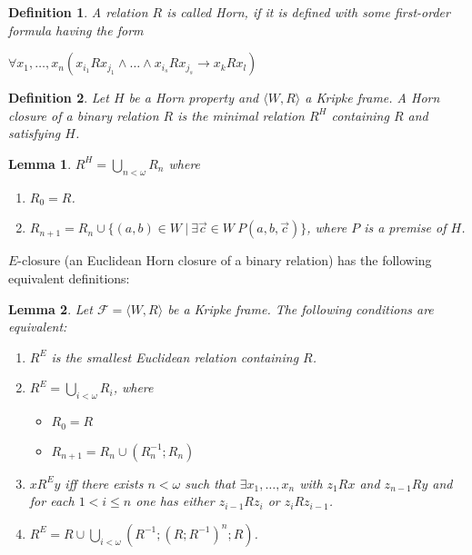 \documentclass[a4paper]{article}
\theoremstyle{defin}
\newtheorem{defin}{Definition}
\theoremstyle{theorem}
\theoremstyle{prop}
\theoremstyle{lemma}
\newtheorem{lemma}{Lemma}
\theoremstyle{ex}
\theoremstyle{col}
\begin{document}
\begin{defin} A relation $R$ is called Horn, if it is defined with some first-order formula having the form

  \begin{center}
    $\forall x_1, \dots, x_n (x_{i_1} R x_{j_1} \land \dots \land x_{i_s} R x_{j_s} \rightarrow x_k R x_l)$
  \end{center}
\end{defin}

\begin{defin}
  Let $H$ be a Horn property and $\langle W, R \rangle$ a Kripke frame. A Horn closure of a binary relation $R$ is the minimal relation $R^{H}$ containing $R$ and satisfying $H$.
\end{defin}

\begin{lemma}
  $R^{H} = \bigcup \limits_{n < \omega} R_n$ where

  \begin{enumerate}
    \item $R_0 = R$.
    \item $R_{n + 1} = R_n \cup \{ (a, b) \in W \: | \: \exists \vec{c} \in W \: P(a, b, \vec{c})\}$, where $P$ is a premise of $H$.
  \end{enumerate}
\end{lemma}

$E$-closure (an Euclidean Horn closure of a binary relation) has the following equivalent definitions:
\begin{lemma}
  Let $\mathcal{F} = \langle W, R \rangle$ be a Kripke frame.
  The following conditions are equivalent:

  \begin{enumerate}
    \item $R^{E}$ is the smallest Euclidean relation containing $R$.
    \item $R^{E} = \bigcup \limits_{i < \omega} R_i$, where
    \begin{itemize}
      \item $R_0 = R$
      \item $R_{n + 1} = R_n \cup (R^{-1}_n ; R_n)$
    \end{itemize}
    \item $x R^E y$ iff there exists $n < \omega$ such that
    $\exists x_1, \dots, x_n$ with $z_1 R x$ and $z_{n - 1} R y$ and for each $1 < i \leq n$ one has
    either $z_{i - 1} R z_i$ or $z_i R z_{i - 1}$.
    \item $R^{E} = R \cup \bigcup \limits_{i < \omega} (R^{-1} ; (R ; R^{-1})^n ; R)$.
  \end{enumerate}
\end{lemma}
\end{document}
